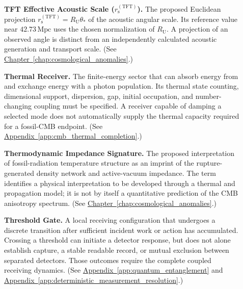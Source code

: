 \begin{description}
\item[] \begin{minipage}[t]{\linewidth}
\textbf{TFT Effective Acoustic Scale ($r_{\mathrm s}^{(\mathrm{TFT})}$).} The proposed Euclidean projection $r_{\mathrm s}^{(\mathrm{TFT})}=R_{\mathrm U}\theta_*$ of the acoustic angular scale. Its reference value near $42.73\,\mathrm{Mpc}$ uses the chosen normalization of $R_{\mathrm U}$. A projection of an observed angle is distinct from an independently calculated acoustic generation and transport scale.
(See \hyperref[chap:cosmological_anomalies]{Chapter~\ref*{chap:cosmological_anomalies}}.)
\end{minipage}

\item[] \begin{minipage}[t]{\linewidth}
\textbf{Thermal Receiver.} The finite-energy sector that can absorb energy from and exchange energy with a photon population. Its thermal state counting, dimensional support, dispersion, gap, initial occupation, and number-changing coupling must be specified. A receiver capable of damping a selected mode does not automatically supply the thermal capacity required for a fossil-CMB endpoint.
(See \hyperref[app:cmb_thermal_completion]{Appendix~\ref*{app:cmb_thermal_completion}}.)
\end{minipage}

\item[] \begin{minipage}[t]{\linewidth}
\textbf{Thermodynamic Impedance Signature.} The proposed interpretation of fossil-radiation temperature structure as an imprint of the rupture-generated density network and active-vacuum impedance. The term identifies a physical interpretation to be developed through a thermal and propagation model; it is not by itself a quantitative prediction of the CMB anisotropy spectrum.
(See \hyperref[chap:cosmological_anomalies]{Chapter~\ref*{chap:cosmological_anomalies}}.)
\end{minipage}

\item[] \begin{minipage}[t]{\linewidth}
\textbf{Threshold Gate.} A local receiving configuration that undergoes a discrete transition after sufficient incident work or action has accumulated. Crossing a threshold can initiate a detector response, but does not alone establish capture, a stable readable record, or mutual exclusion between separated detectors. Those outcomes require the complete coupled receiving dynamics.
(See \hyperref[app:quantum_entanglement]{Appendix~\ref*{app:quantum_entanglement}} and \hyperref[app:deterministic_measurement_resolution]{Appendix~\ref*{app:deterministic_measurement_resolution}}.)
\end{minipage}


\end{description}
